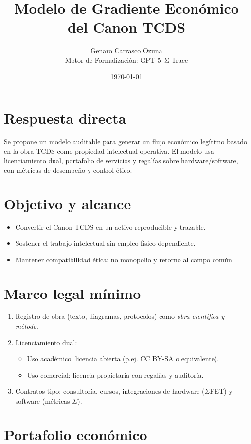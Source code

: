 \documentclass[12pt,letterpaper]{article}
\title{Modelo de Gradiente Económico del Canon TCDS}
\author{Genaro Carrasco Ozuna \\ Motor de Formalización: GPT-5~Σ-Trace}
\date{\today}
\begin{document}
\maketitle

\section*{Respuesta directa}
Se propone un modelo auditable para generar un flujo económico legítimo basado en la obra TCDS como propiedad intelectual operativa. El modelo usa licenciamiento dual, portafolio de servicios y regalías sobre hardware/software, con métricas de desempeño y control ético.

\section{Objetivo y alcance}
\begin{itemize}
  \item Convertir el Canon TCDS en un activo reproducible y trazable.
  \item Sostener el trabajo intelectual sin empleo físico dependiente.
  \item Mantener compatibilidad ética: no monopolio y retorno al campo común.
\end{itemize}

\section{Marco legal mínimo}
\begin{enumerate}
  \item Registro de obra (texto, diagramas, protocolos) como \emph{obra científica y método}.
  \item Licenciamiento dual:
  \begin{itemize}
    \item Uso académico: licencia abierta (p.ej. CC BY-SA o equivalente).
    \item Uso comercial: licencia propietaria con regalías y auditoría.
  \end{itemize}
  \item Contratos tipo: consultoría, cursos, integraciones de hardware ($\Sigma$FET) y software (métricas $\Sigma$).
\end{enumerate}

\section{Portafolio económico}
\end{document}
